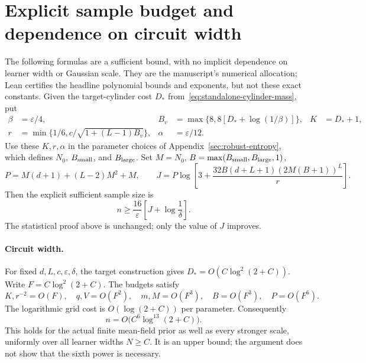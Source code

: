 
\section{Explicit sample budget and dependence on circuit width}
\label{sec:explicit-budget}

The following formulas are a sufficient bound, with no implicit dependence
on learner width or Gaussian scale. They are the manuscript's numerical
allocation; Lean certifies the headline polynomial bounds and exponents,
but not these exact constants. Given the target-cylinder cost $D_*$
from~\eqref{eq:standalone-cylinder-mass}, put
\begin{align*}
 \beta&=\varepsilon/4,&
 B_v&=\max\{8,8[D_*+\log(1/\beta)]\},&
 K&=D_*+1,\\
 r&=\min\{1/6,c/\sqrt{1+(L-1)B_v}\},&
 \alpha&=\varepsilon/12.
\end{align*}
Use these $K,r,\alpha$ in the parameter choices of
Appendix~\ref{sec:robust-entropy}, which defines $N_0$, $B_{\rm small}$,
and $B_{\rm large}$. Set
$M=N_0$, $B=\max(B_{\rm small},B_{\rm large},1)$,
\[
 P=M(d+1)+(L-2)M^2+M,\qquad
 J=P\log\left[3+\frac{32B(d+L+1)(2M(B+1))^L}{r}\right].
\]
Then the explicit sufficient sample size is
\begin{equation}\label{eq:explicit-samples}
 n\ge\frac{16}{\varepsilon}\left[J+\log\frac1\delta\right].
\end{equation}
The statistical proof above is unchanged; only the value of $J$ improves.

\paragraph{Circuit width.}
For fixed $d,L,c,\varepsilon,\delta$, the target construction gives
$D_*=O(C\log^2(2+C))$. Write $F=C\log^2(2+C)$. The budgets satisfy
\[
 K,r^{-2}=O(F),\quad q,V=O(F^2),\quad m,M=O(F^3),
 \quad B=O(F^3),\quad P=O(F^6).
\]
The logarithmic grid cost is $O(\log(2+C))$ per parameter. Consequently
\[
 n=O\bigl(C^6\log^{13}(2+C)\bigr).
\]
This holds for the actual finite mean-field prior as well as every stronger
scale, uniformly over all learner widths $N\ge C$. It is an upper bound;
the argument does not show that the sixth power is necessary.

